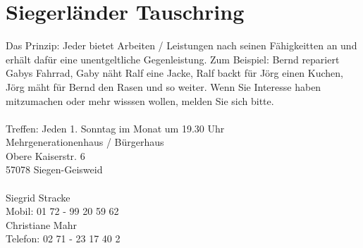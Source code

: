 \section{Siegerländer Tauschring}
Das Prinzip: Jeder bietet Arbeiten / Leistungen nach seinen Fähigkeitten an und erhält dafür eine unentgeltliche Gegenleistung. Zum Beispiel: Bernd repariert Gabys Fahrrad, Gaby näht Ralf eine Jacke, Ralf backt für Jörg einen Kuchen, Jörg mäht für Bernd den Rasen und so weiter. Wenn Sie Interesse haben mitzumachen oder mehr wisssen wollen, melden Sie sich bitte.\\
\\
Treffen: Jeden 1. Sonntag im Monat um 19.30 Uhr\\
Mehrgenerationenhaus / Bürgerhaus\\
Obere Kaiserstr. 6\\
57078 Siegen-Geisweid \\
\\
Siegrid Stracke\\
Mobil: 01 72 - 99 20 59 62 \\
Christiane Mahr\\
Telefon: 02 71 - 23 17 40 2